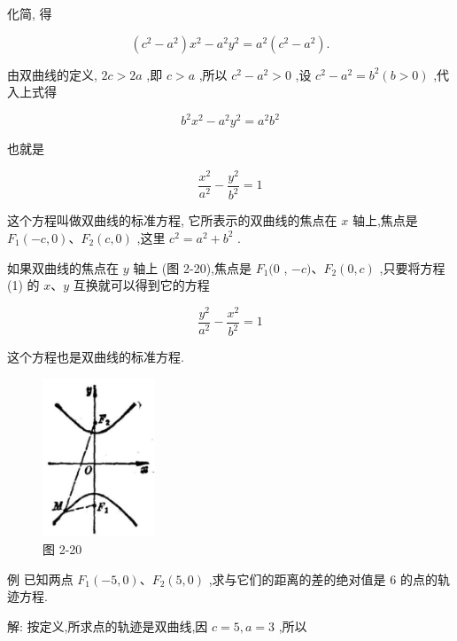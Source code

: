 \documentclass[lang=cn,newtx,12pt,scheme=chinese]{elegantbook}
\begin{document}
化简, 得

\[
  \left( {{c}^{2} - {a}^{2}}\right) {x}^{2} - {a}^{2}{y}^{2} = {a}^{2}\left( {{c}^{2} - {a}^{2}}\right) .
\]

由双曲线的定义, \({2c} > {2a}\) ,即 \(c > a\) ,所以 \({c}^{2} - {a}^{2} > 0\) ,设 \({c}^{2} - {a}^{2} = {b}^{2}\left( {b > 0}\right)\) ,代入上式得

\[
    {b}^{2}{x}^{2} - {a}^{2}{y}^{2} = {a}^{2}{b}^{2}
\]

也就是
\begin{definition}[双曲线的标准方程] 
\[
  \frac{{x}^{2}}{{a}^{2}} - \frac{{y}^{2}}{{b}^{2}} = 1 \tag{1}
\]

这个方程叫做双曲线的标准方程, 它所表示的双曲线的焦点在 \(x\) 轴上,焦点是 \({F}_{1}\left( {-c,0}\right) \text{、}{F}_{2}\left( {c,0}\right)\) ,这里 \({c}^{2} = {a}^{2} + {b}^{2}\) .
\end{definition}

\begin{corollary}[双曲线标准方程2]
	

如果双曲线的焦点在 \(y\) 轴上 (图 2-20),焦点是 \({F}_{1}(0\) , \(- c)\text{、}{F}_{2}\left( {0,c}\right)\) ,只要将方程 (1) 的 \(x\text{、}y\) 互换就可以得到它的方程

\[
  \frac{{y}^{2}}{{a}^{2}} - \frac{{x}^{2}}{{b}^{2}} = 1
\]

这个方程也是双曲线的标准方程.

\end{corollary}
\begin{figure}[h]
  \centering
  \includegraphics[max width=0.3\textwidth]{images/01912cc2-ffb6-728e-9ae7-b113ff05c64b_98_269004.jpg}
  \caption{图 2-20}
\end{figure}

例 已知两点 \({F}_{1}\left( {-5,0}\right) \text{、}{F}_{2}\left( {5,0}\right)\) ,求与它们的距离的差的绝对值是 6 的点的轨迹方程.

解: 按定义,所求点的轨迹是双曲线,因 \(c = 5,a = 3\) ,所以
\end{document}
